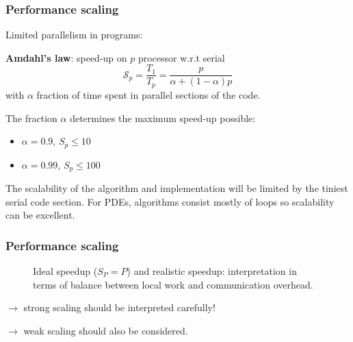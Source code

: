 \begin{frame}
  \frametitle{Performance scaling}

Limited parallelism in programs:

\medskip
\textbf{Amdahl's law}: speed-up on $p$ processor w.r.t serial
\begin{equation*}
\mathcal{S}_p = \dfrac{T_1}{T_p} = \dfrac{p}{\alpha + (1 - \alpha) p}
\end{equation*}
with $\alpha$ fraction of time spent in parallel sections of the code.

\medskip
The fraction $\alpha$ determines the maximum speed-up possible:
\begin{itemize}
\item $\alpha = 0.9$, $S_p \leq 10$\\[2ex]
\item $\alpha = 0.99$, $S_p \leq 100$
\end{itemize}

\medskip
The scalability of the algorithm and implementation will be limited by the tiniest serial code section.
For PDEs, algorithms consist mostly of loops so scalability can be excellent.

\end{frame}

\begin{frame}
  \frametitle{Performance scaling}


\begin{figure}
  \centering
  \caption{Ideal speedup ($S_P = P$) and realistic speedup: interpretation in terms of balance between local work and communication overhead.}
  \label{fig:scalability}
\end{figure}

$\rightarrow$ strong scaling should be interpreted carefully!

$\rightarrow$ weak scaling should also be considered.

\end{frame}


